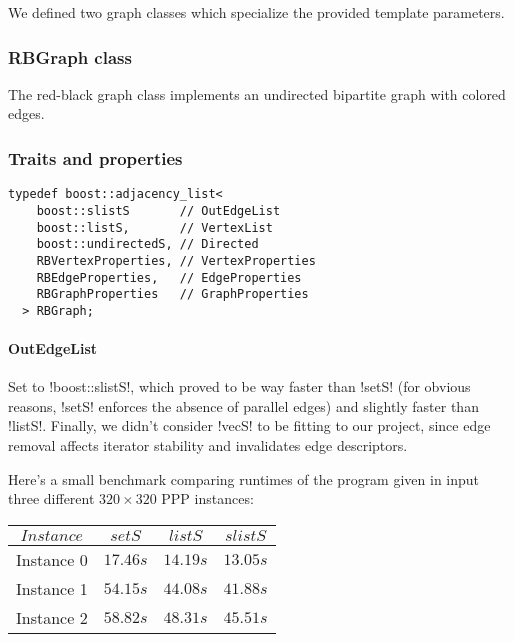 We defined two graph classes which specialize the provided template parameters.

\subsubsection{RBGraph class}\label{section:rbgraph-class}

The red-black graph class implements an undirected bipartite graph with colored edges.

\subsubsection*{Traits and properties}


\begin{lstlisting}[belowskip=0pt]
  typedef boost::adjacency_list<
    boost::slistS       // OutEdgeList
    boost::listS,       // VertexList
    boost::undirectedS, // Directed
    RBVertexProperties, // VertexProperties
    RBEdgeProperties,   // EdgeProperties
    RBGraphProperties   // GraphProperties
  > RBGraph;
\end{lstlisting}

\paragraph{OutEdgeList}

Set to !boost::slistS!, which proved to be way faster than !setS! (for obvious reasons, !setS! enforces the absence of parallel edges) and slightly faster than !listS!.
Finally, we didn't consider !vecS! to be fitting to our project, since edge removal affects iterator stability and invalidates edge descriptors.

Here's a small benchmark comparing runtimes of the program given in input three different $320 \times 320$ PPP instances:

\begin{center}
  \begin{tabular}{c | c c c}
    $Instance$ & $setS$   & $listS$  & $slistS$ \\
    \hline
    Instance 0 & $17.46s$ & $14.19s$ & $13.05s$ \\
    Instance 1 & $54.15s$ & $44.08s$ & $41.88s$ \\
    Instance 2 & $58.82s$ & $48.31s$ & $45.51s$
  \end{tabular}
\end{center}

